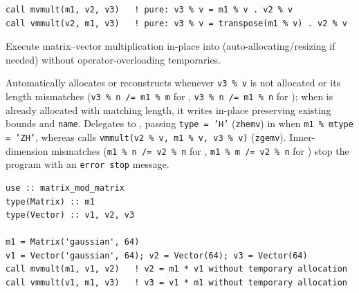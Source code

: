
\lstset{language=[95]Fortran}
\begin{lstlisting}
call mvmult(m1, v2, v3)   ! pure: v3 % v = m1 % v . v2 % v
call vmmult(v2, m1, v3)   ! pure: v3 % v = transpose(m1 % v) . v2 % v
\end{lstlisting}

Execute matrix--vector multiplication in-place into  (auto-allocating/resizing  if needed) without operator-overloading temporaries.

Automatically allocates or reconstructs  whenever \texttt{v3 \% v} is not allocated or its length mismatches (\texttt{v3 \% n /= m1 \% m} for , \texttt{v3 \% n /= m1 \% n} for ); when  is already allocated with matching length, it writes in-place preserving existing bounds and \texttt{name}. Delegates to , passing \texttt{type = 'H'} (\texttt{zhemv}) in  when \texttt{m1 \% mtype = 'ZH'}, whereas  calls \texttt{vmmult(v2 \% v, m1 \% v, v3 \% v)} (\texttt{zgemv}). Inner-dimension mismatches (\texttt{m1 \% n /= v2 \% n} for , \texttt{m1 \% m /= v2 \% n} for ) stop the program with an \texttt{error stop} message.

\begin{description}[leftmargin=2.2cm, style=nextline]
\end{description}

\lstset{language=[95]Fortran}
\begin{lstlisting}
use :: matrix_mod_matrix
type(Matrix) :: m1
type(Vector) :: v1, v2, v3

m1 = Matrix('gaussian', 64)
v1 = Vector('gaussian', 64); v2 = Vector(64); v3 = Vector(64)
call mvmult(m1, v1, v2)   ! v2 = m1 * v1 without temporary allocation
call vmmult(v1, m1, v3)   ! v3 = v1 * m1 without temporary allocation
\end{lstlisting}

